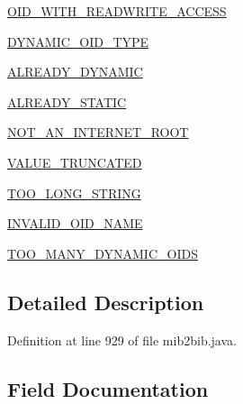 \begin{DoxyCompactItemize}
\item 
\hyperlink{enummib2bib_1_1mib2bib_1_1_f_i_l_e___e_r_r_o_r___c_o_d_e_af873378d8c62f57d70359d285d20c468}{O\+I\+D\+\_\+\+W\+I\+T\+H\+\_\+\+R\+E\+A\+D\+W\+R\+I\+T\+E\+\_\+\+A\+C\+C\+E\+S\+S}
\item 
\hyperlink{enummib2bib_1_1mib2bib_1_1_f_i_l_e___e_r_r_o_r___c_o_d_e_a460f2ac18cfcc297bd58fd81dc95efe8}{D\+Y\+N\+A\+M\+I\+C\+\_\+\+O\+I\+D\+\_\+\+T\+Y\+P\+E}
\item 
\hyperlink{enummib2bib_1_1mib2bib_1_1_f_i_l_e___e_r_r_o_r___c_o_d_e_a774d83f684d17dbb3ead8b5eed224236}{A\+L\+R\+E\+A\+D\+Y\+\_\+\+D\+Y\+N\+A\+M\+I\+C}
\item 
\hyperlink{enummib2bib_1_1mib2bib_1_1_f_i_l_e___e_r_r_o_r___c_o_d_e_afafe9aa4095a8d773d4b917e6c11f373}{A\+L\+R\+E\+A\+D\+Y\+\_\+\+S\+T\+A\+T\+I\+C}
\item 
\hyperlink{enummib2bib_1_1mib2bib_1_1_f_i_l_e___e_r_r_o_r___c_o_d_e_a7e7be11f81e58bb1f9559cdb0dd4783f}{N\+O\+T\+\_\+\+A\+N\+\_\+\+I\+N\+T\+E\+R\+N\+E\+T\+\_\+\+R\+O\+O\+T}
\item 
\hyperlink{enummib2bib_1_1mib2bib_1_1_f_i_l_e___e_r_r_o_r___c_o_d_e_aa5f01ad787de75486af134e1eb2328cd}{V\+A\+L\+U\+E\+\_\+\+T\+R\+U\+N\+C\+A\+T\+E\+D}
\item 
\hyperlink{enummib2bib_1_1mib2bib_1_1_f_i_l_e___e_r_r_o_r___c_o_d_e_ab273c01bb2b2f0424975e3f1242359b3}{T\+O\+O\+\_\+\+L\+O\+N\+G\+\_\+\+S\+T\+R\+I\+N\+G}
\item 
\hyperlink{enummib2bib_1_1mib2bib_1_1_f_i_l_e___e_r_r_o_r___c_o_d_e_ab13978cde46bae539a3e0f6c0fee0a64}{I\+N\+V\+A\+L\+I\+D\+\_\+\+O\+I\+D\+\_\+\+N\+A\+M\+E}
\item 
\hyperlink{enummib2bib_1_1mib2bib_1_1_f_i_l_e___e_r_r_o_r___c_o_d_e_a3d0dc5f9c48d0162576470acbe8a7df9}{T\+O\+O\+\_\+\+M\+A\+N\+Y\+\_\+\+D\+Y\+N\+A\+M\+I\+C\+\_\+\+O\+I\+D\+S}
\end{DoxyCompactItemize}


\subsection{Detailed Description}


Definition at line 929 of file mib2bib.\+java.



\subsection{Field Documentation}
\hypertarget{enummib2bib_1_1mib2bib_1_1_f_i_l_e___e_r_r_o_r___c_o_d_e_a71f3e985aa8686d7429a2ce4edc921f0}{}
